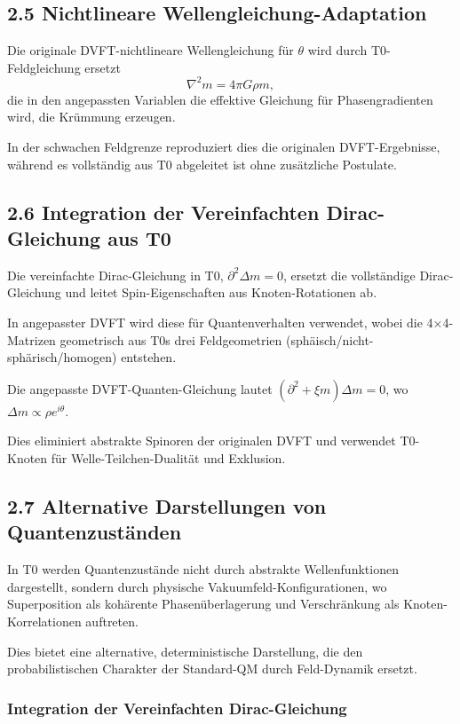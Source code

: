 	\subsection{2.5 Nichtlineare Wellengleichung-Adaptation}
	
	Die originale DVFT-nichtlineare Wellengleichung für $\theta$ wird durch T0-Feldgleichung ersetzt
	\[
	\nabla^2 m = 4\pi G \rho m,
	\]
	die in den angepassten Variablen die effektive Gleichung für Phasengradienten wird, die Krümmung erzeugen.
	
	In der schwachen Feldgrenze reproduziert dies die originalen DVFT-Ergebnisse, während es vollständig aus T0 abgeleitet ist ohne zusätzliche Postulate.
	
	\subsection{2.6 Integration der Vereinfachten Dirac-Gleichung aus T0}
	
	Die vereinfachte Dirac-Gleichung in T0, $\partial^2 \Delta m = 0$, ersetzt die vollständige Dirac-Gleichung und leitet Spin-Eigenschaften aus Knoten-Rotationen ab.
	
	In angepasster DVFT wird diese für Quantenverhalten verwendet, wobei die 4×4-Matrizen geometrisch aus T0s drei Feldgeometrien (sphäisch/nicht-sphärisch/homogen) entstehen.
	
	Die angepasste DVFT-Quanten-Gleichung lautet $(\partial^2 + \xi m) \Delta m = 0$, wo $\Delta m \propto \rho e^{i\theta}$.
	
	Dies eliminiert abstrakte Spinoren der originalen DVFT und verwendet T0-Knoten für Welle-Teilchen-Dualität und Exklusion.
	
	\subsection{2.7 Alternative Darstellungen von Quantenzuständen}
	
	In T0 werden Quantenzustände nicht durch abstrakte Wellenfunktionen dargestellt, sondern durch physische Vakuumfeld-Konfigurationen, wo Superposition als kohärente Phasenüberlagerung und Verschränkung als Knoten-Korrelationen auftreten.
	
	Dies bietet eine alternative, deterministische Darstellung, die den probabilistischen Charakter der Standard-QM durch Feld-Dynamik ersetzt.
	
	\subsubsection{Integration der Vereinfachten Dirac-Gleichung}
	
